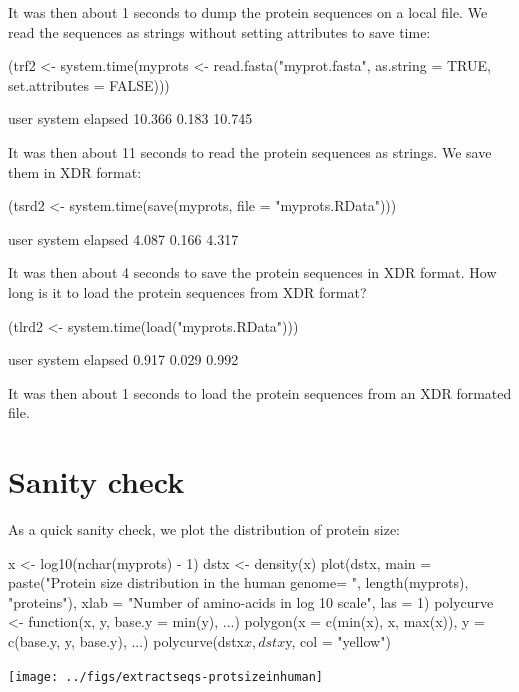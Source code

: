 \documentclass{article}
\begin{document}
It was then about 1 seconds
to dump the protein sequences on a local file. We read the sequences as strings
without setting attributes to save time:

\begin{Schunk}
\begin{Sinput}
 (trf2 <- system.time(myprots <- read.fasta("myprot.fasta", 
     as.string = TRUE, set.attributes = FALSE)))
\end{Sinput}
\begin{Soutput}
   user  system elapsed 
 10.366   0.183  10.745 
\end{Soutput}
\end{Schunk}

It was then about 11 seconds
to read the protein sequences as strings. We save them in XDR format:

\begin{Schunk}
\begin{Sinput}
 (tsrd2 <- system.time(save(myprots, file = "myprots.RData")))
\end{Sinput}
\begin{Soutput}
   user  system elapsed 
  4.087   0.166   4.317 
\end{Soutput}
\end{Schunk}

It was then about 4 seconds
to save the protein sequences in XDR format. How long is it to load the 
protein sequences from XDR format?

\begin{Schunk}
\begin{Sinput}
 (tlrd2 <- system.time(load("myprots.RData")))
\end{Sinput}
\begin{Soutput}
   user  system elapsed 
  0.917   0.029   0.992 
\end{Soutput}
\end{Schunk}

It was then about 1 seconds
to load the protein sequences from an XDR formated file.

\section{Sanity check}

As a quick sanity check, we plot the distribution of protein size:


\begin{Schunk}
\begin{Sinput}
 x <- log10(nchar(myprots) - 1)
 dstx <- density(x)
 plot(dstx, main = paste("Protein size distribution in the human genome\nn = ", 
     length(myprots), "proteins"), xlab = "Number of amino-acids in log 10 scale", 
     las = 1)
 polycurve <- function(x, y, base.y = min(y), ...) polygon(x = c(min(x), 
     x, max(x)), y = c(base.y, y, base.y), ...)
 polycurve(dstx$x, dstx$y, col = "yellow")
\end{Sinput}
\end{Schunk}
\texttt{[image: ../figs/extractseqs-protsizeinhuman]}
\end{document}
